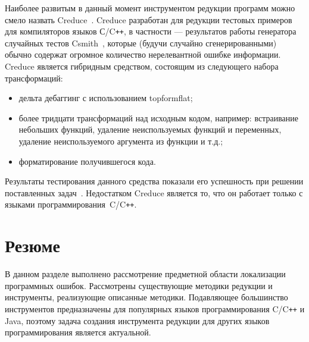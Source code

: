 Наиболее развитым в данный момент инструментом редукции программ можно смело назвать Creduce~\cite{regehr2012test}. Creduce разработан для редукции тестовых примеров для компиляторов языков С/C\texttt{++}, в частности --- результатов работы генератора случайных тестов Csmith~\cite{yang2011finding}, которые (будучи случайно сгенерированными) обычно содержат огромное количество нерелевантной ошибке информации. Creduce является гибридным средством, состоящим из следующего набора трансформаций:
%
\begin{itemize}
	\item дельта дебаггинг с использованием topformflat;
	\item более тридцати трансформаций над исходным кодом, например: встраивание небольших функций, удаление неиспользуемых функций и переменных, удаление неиспользуемого аргумента из функции и т.д.;
	\item форматирование получившегося кода.
\end{itemize}
%
Результаты тестирования данного средства показали его успешность при решении поставленных задач~\cite{groce2016cause}. Недостатком Creduce является то, что он работает только с языками программирования~C/C\texttt{++}.

\section{Резюме}
В данном разделе выполнено рассмотрение предметной области локализации программных ошибок. Рассмотрены существующие методики редукции и инструменты, реализующие описанные методики. Подавляющее большинство инструментов предназначены для популярных языков программирования C/C\texttt{++} и Java, поэтому задача создания инструмента редукции для других языков программирования является актуальной.
